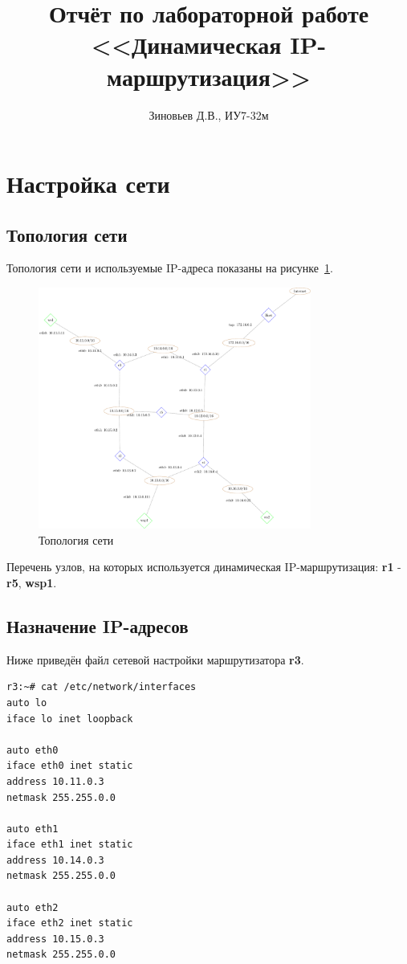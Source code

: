 \documentclass[a4paper,12pt]{article}
\title{Отчёт по лабораторной работе \\ <<Динамическая IP-маршрутизация>>}
\author{Зиновьев Д.В., ИУ7-32м}
\begin{document}
\maketitle

\tableofcontents

\section{Настройка сети}

\subsection{Топология сети}

Топология сети и используемые IP-адреса показаны на рисунке~\ref{fig:network}.

\begin{figure}
\centering
\includegraphics[width=0.8\textwidth]{includes/network_gv.pdf}
\caption{Топология сети}
\label{fig:network}
\end{figure}

Перечень узлов, на которых используется динамическая IP-маршрутизация: \textbf{r1} - \textbf{r5}, \textbf{wsp1}.


\subsection{Назначение IP-адресов}

Ниже приведён файл сетевой настройки  маршрутизатора \textbf{r3}.

\begin{Verbatim}
r3:~# cat /etc/network/interfaces 
auto lo
iface lo inet loopback

auto eth0
iface eth0 inet static
address 10.11.0.3
netmask 255.255.0.0

auto eth1
iface eth1 inet static
address 10.14.0.3
netmask 255.255.0.0

auto eth2
iface eth2 inet static
address 10.15.0.3
netmask 255.255.0.0
\end{Verbatim}
\end{document}
